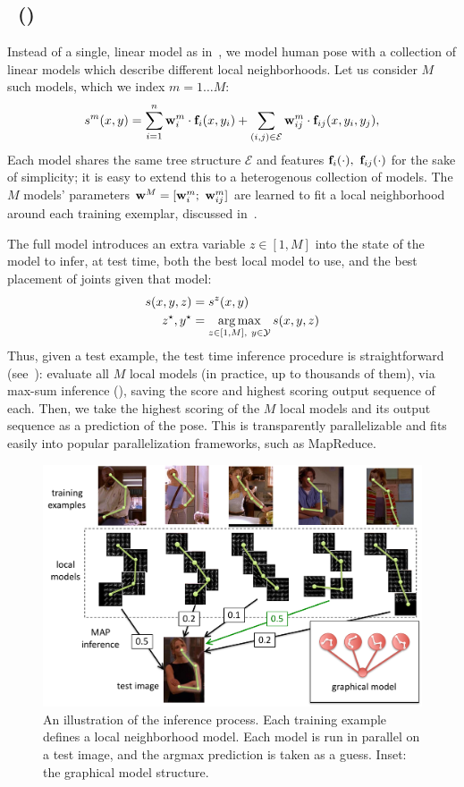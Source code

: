 \subsection{\LLPSlong~(\LLPS)}
Instead of a single, linear model as in~, we model human pose 
with a collection of linear models which describe different local 
neighborhoods.  Let us consider $M$ such models, which we index $m = 1 \ldots 
M$:
\begin{align}
s^m(x,y) = \sum_{i=1}^n \mathbf{w}^m_i \cdot \mathbf{f}_i(x,y_i) + \sum_{(i,j) \in \mathcal{E}} 
\mathbf{w}^m_{ij} \cdot \mathbf{f}_{ij}(x,y_i,y_j),
\end{align}
Each model shares the same tree structure $\mathcal{E}$ and features 
$\mathbf{f}_i(\cdot),~\mathbf{f}_{ij}(\cdot)$ for the sake of simplicity; it is easy to extend 
this to a heterogenous collection of models.  The $M$ models' parameters $\mathbf{w}^M 
= [\mathbf{w}^m_i;~\mathbf{w}^m_{ij}]$ are learned to fit a local neighborhood around each 
training exemplar, discussed in~.

The full \LLPS model introduces an extra variable $z \in [1,M]$ into the state 
of the model to infer, at test time, both the best local model to use, and the 
best placement of joints given that model:
\begin{align}
s(x,y,z) &= s^z(x,y) \\
z^\star,y^\star &= \mathop{\arg\max}_{z \in [1,M],~y \in \mathcal{Y}} s(x,y,z) 
\end{align}
Thus, given a test example, the test time inference procedure is 
straightforward (see~): evaluate all $M$ local models 
(in practice, up to thousands of them), via max-sum inference 
(), saving the score and highest scoring output sequence of 
each.  Then, we take the highest scoring of the $M$ local models and its output 
sequence as a prediction of the pose.  This is transparently parallelizable and 
fits easily into popular parallelization frameworks, such as MapReduce.

\begin{figure}[tb!]
\centering
\includegraphics[width=0.99\linewidth]{figs/llps-inference.pdf}
\caption{\label{fig:llps-inference} An illustration of the inference process.  
Each training example defines a local neighborhood model.  Each model is run in 
parallel on a test image, and the argmax prediction is taken as a guess. Inset: 
the graphical model structure.}
\end{figure}

